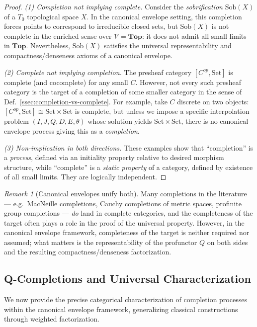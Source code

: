 \documentclass[11pt]{article}
\theoremstyle{plain}
\theoremstyle{definition}
\theoremstyle{remark}
\newtheorem{remark}[theorem]{Remark}
\newcommand{\V}{\mathcal{V}}
\newcommand{\Set}{\mathrm{Set}}
\newcommand{\Sob}{\mathrm{Sob}}
\begin{document}
\begin{proof}
\emph{(1) Completion not implying complete.}  
Consider the \emph{sobrification} $\Sob(X)$ of a $T_0$ topological space $X$.  
In the canonical envelope setting, this completion forces points to correspond to irreducible closed sets, but $\Sob(X)$ is not complete in the enriched sense over $\V=\mathbf{Top}$: it does not admit all small limits in $\mathbf{Top}$.  
Nevertheless, $\Sob(X)$ satisfies the universal representability and compactness/denseness axioms of a canonical envelope.

\emph{(2) Complete not implying completion.}  
The presheaf category $[C^{op},\Set]$ is complete (and cocomplete) for any small $C$.  
However, not every such presheaf category is the target of a completion of some smaller category in the sense of Def.~\ref{ssec:completion-vs-complete}.  
For example, take $C$ discrete on two objects: $[C^{op},\Set] \cong \Set\times\Set$ is complete, but unless we impose a specific interpolation problem $(I,J,Q,D,E,\theta)$ whose solution yields $\Set\times\Set$, there is no canonical envelope process giving this as a \emph{completion}.

\emph{(3) Non-implication in both directions.}  
These examples show that ``completion'' is a \emph{process}, defined via an initiality property relative to desired morphism structure, while ``complete'' is a \emph{static property} of a category, defined by existence of all small limits.  They are logically independent.
\end{proof}

\begin{remark}[Canonical envelopes unify both]
Many completions in the literature --- e.g.\ MacNeille completions, Cauchy completions of metric spaces, profinite group completions --- \emph{do} land in complete categories, and the completeness of the target often plays a role in the proof of the universal property.  
However, in the canonical envelope framework, completeness of the target is neither required nor assumed; what matters is the representability of the profunctor $Q$ on both sides and the resulting compactness/denseness factorization.
\end{remark}

\subsection{Q-Completions and Universal Characterization}\label{ssec:q-completions}

We now provide the precise categorical characterization of completion processes within the canonical envelope framework, generalizing classical constructions through weighted factorization.
\end{document}
